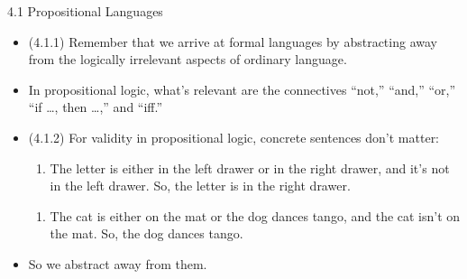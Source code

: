 \begin{frame}{4.1 Propositional Languages}


	\begin{itemize}
	
		\item (4.1.1) Remember that we arrive at formal languages by abstracting away from the logically irrelevant aspects of ordinary language.
		
		\item In propositional logic, what's relevant are the connectives ``not,'' ``and,'' ``or,'' ``if \dots, then \dots,'' and ``iff.''
	
		\item (4.1.2) For validity in propositional logic, concrete sentences don't matter:
	\begin{enumerate}[(1)]
		
			\item The letter is either in the left drawer or in the right drawer, and it's not in the left drawer. So, the letter is in the right drawer.
		
		\end{enumerate}
	\begin{enumerate}[(1')]
		
			\item The cat is either on the mat or the dog dances tango, and the cat isn't on the mat. So, the dog dances tango.
		
		\end{enumerate}
		
		\item So we abstract away from them.
	
	
	\end{itemize}
		
\end{frame}

